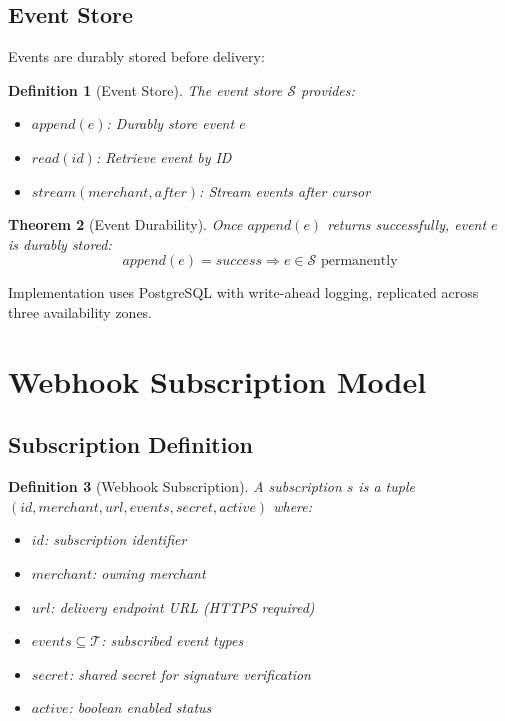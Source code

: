 \documentclass[11pt,a4paper]{article}
\newtheorem{theorem}{Theorem}[section]
\newtheorem{definition}[theorem]{Definition}
\begin{document}
\subsection{Event Store}

Events are durably stored before delivery:

\begin{definition}[Event Store]
The event store $\mathcal{S}$ provides:
\begin{itemize}
    \item $append(e)$: Durably store event $e$
    \item $read(id)$: Retrieve event by ID
    \item $stream(merchant, after)$: Stream events after cursor
\end{itemize}
\end{definition}

\begin{theorem}[Event Durability]
Once $append(e)$ returns successfully, event $e$ is durably stored:
\[
append(e) = success \Rightarrow e \in \mathcal{S} \text{ permanently}
\]
\end{theorem}

Implementation uses PostgreSQL with write-ahead logging, replicated across three availability zones.

\section{Webhook Subscription Model}

\subsection{Subscription Definition}

\begin{definition}[Webhook Subscription]
A subscription $s$ is a tuple $(id, merchant, url, events, secret, active)$ where:
\begin{itemize}
    \item $id$: subscription identifier
    \item $merchant$: owning merchant
    \item $url$: delivery endpoint URL (HTTPS required)
    \item $events \subseteq \mathcal{T}$: subscribed event types
    \item $secret$: shared secret for signature verification
    \item $active$: boolean enabled status
\end{itemize}
\end{definition}
\end{document}
